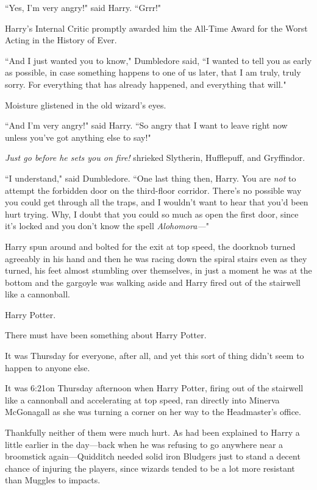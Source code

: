 ``Yes, I'm very angry!" said Harry. ``Grrr!"

Harry's Internal Critic promptly awarded him the All-Time Award for the Worst Acting in the History of Ever.

``And I just wanted you to know," Dumbledore said, ``I wanted to tell you as early as possible, in case something happens to one of us later, that I am truly, truly sorry. For everything that has already happened, and everything that will."

Moisture glistened in the old wizard's eyes.

``And I'm very angry!" said Harry. ``So angry that I want to leave right now unless you've got anything else to say!"

\emph{Just \emph{go} before he sets you on fire!} shrieked Slytherin, Hufflepuff, and Gryffindor.

``I understand," said Dumbledore. ``One last thing then, Harry. You are \emph{not} to attempt the forbidden door on the third-floor corridor. There's no possible way you could get through all the traps, and I wouldn't want to hear that you'd been hurt trying. Why, I doubt that you could so much as open the first door, since it's locked and you don't know the spell \emph{Alohomora—}"

Harry spun around and bolted for the exit at top speed, the doorknob turned agreeably in his hand and then he was racing down the spiral stairs even as they turned, his feet almost stumbling over themselves, in just a moment he was at the bottom and the gargoyle was walking aside and Harry fired out of the stairwell like a cannonball.

\later

Harry Potter.

There must have been something about Harry Potter.

It was Thursday for everyone, after all, and yet this sort of thing didn't seem to happen to anyone else.

It was 6:21\pm on Thursday afternoon when Harry Potter, firing out of the stairwell like a cannonball and accelerating at top speed, ran directly into Minerva McGonagall as she was turning a corner on her way to the Headmaster's office.

Thankfully neither of them were much hurt. As had been explained to Harry a little earlier in the day—back when he was refusing to go anywhere near a broomstick again—Quidditch needed solid iron Bludgers just to stand a decent chance of injuring the players, since wizards tended to be a lot more resistant than Muggles to impacts.

